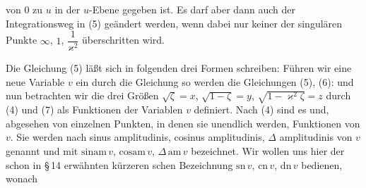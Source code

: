 von 0 zu \(u\) in der \(u\)-Ebene gegeben ist. Es darf aber dann auch der
Integrationsweg in (5) geändert werden, wenn dabei nur keiner der
singulären Punkte \(\infty\), \(1\), \(\dfrac{1}{\varkappa^2}\) überschritten wird.

Die Gleichung (5) läßt sich in folgenden drei Formen schreiben:
Führen wir eine neue Variable \(v\) ein durch die Gleichung
so werden die Gleichungen (5), (6):
und nun betrachten wir die drei Größen \(\sqrt{\zeta} = x\), \(\sqrt{1-\zeta} = y\),
\(\sqrt{1-\varkappa^2\zeta} = z\) durch (4) und (7) als Funktionen der Variablen \(v\)
definiert. Nach (4) sind es  und, abgesehen
von einzelnen Punkten, in denen sie unendlich werden,  Funktionen
von \(v\). Sie werden nach  sinus amplitudinis, cosinus
amplitudinis, \(\varDelta\) amplitudinis von \(v\) genannt und mit \(\mathrm{sinam}\,v\),
\(\mathrm{cosam}\,v\), \(\varDelta\,\mathrm{am}\,v\) bezeichnet. Wir wollen uns hier der schon in
\S\,14 erwähnten kürzeren schen Bezeichnung
\(\mathrm{sn}\,v\), \(\mathrm{cn}\,v\), \(\mathrm{dn}\,v\) bedienen, wonach
